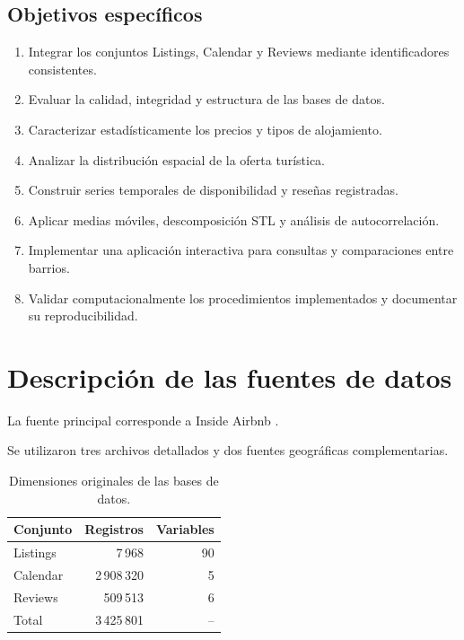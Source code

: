 \documentclass[11pt,a4paper]{article}
\begin{document}
\subsection{Objetivos específicos}

\begin{enumerate}
    \item Integrar los conjuntos Listings, Calendar
    y Reviews mediante identificadores consistentes.

    \item Evaluar la calidad, integridad y estructura
    de las bases de datos.

    \item Caracterizar estadísticamente los precios
    y tipos de alojamiento.

    \item Analizar la distribución espacial de la oferta
    turística.

    \item Construir series temporales de disponibilidad
    y reseñas registradas.

    \item Aplicar medias móviles, descomposición STL
    y análisis de autocorrelación.

    \item Implementar una aplicación interactiva
    para consultas y comparaciones entre barrios.

    \item Validar computacionalmente los procedimientos
    implementados y documentar su reproducibilidad.
\end{enumerate}


\section{Descripción de las fuentes de datos}

La fuente principal corresponde a Inside Airbnb
\cite{insideairbnb}.

Se utilizaron tres archivos detallados y dos fuentes
geográficas complementarias.

\begin{table}[H]
\centering
\caption{Dimensiones originales de las bases de datos.}
\begin{tabular}{lrr}
\toprule
Conjunto & Registros & Variables\\
\midrule
Listings & 7\,968 & 90\\
Calendar & 2\,908\,320 & 5\\
Reviews & 509\,513 & 6\\
\midrule
Total & 3\,425\,801 & --\\
\bottomrule
\end{tabular}
\end{table}
\end{document}
